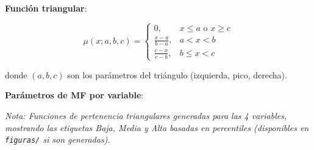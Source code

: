 \documentclass[12pt,letterpaper,twoside]{report}
\begin{document}
\begin{calculobox}
\textbf{Función triangular}:

\begin{equation}
\mu(x; a, b, c) = 
\begin{cases}
0, & x \leq a \text{ o } x \geq c \\
\frac{x-a}{b-a}, & a < x < b \\
\frac{c-x}{c-b}, & b \leq x < c
\end{cases}
\end{equation}

donde $(a, b, c)$ son los parámetros del triángulo (izquierda, pico, derecha).

\textbf{Parámetros de MF por variable}:

\begin{table}[H]
\centering
\caption{Parámetros de Funciones de Pertenencia (Percentiles)}
\label{tab:mf_params}
\end{table}
\end{calculobox}

\textit{Nota: Funciones de pertenencia triangulares generadas para las 4 variables, mostrando las etiquetas Baja, Media y Alta basadas en percentiles (disponibles en \texttt{figuras/} si son generadas).}
\end{document}
